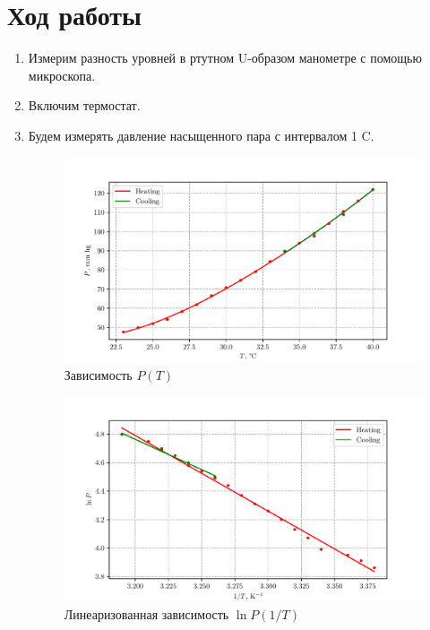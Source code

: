 \documentclass[12pt]{article}
\begin{document}
    \section{Ход работы}
    \begin{enumerate} 
        \item Измерим разность уровней в ртутном U-образом манометре с помощью
        микроскопа.
        \item Включим термостат.
        \item Будем измерять давление насыщенного пара с интервалом 1 \textdegree C.
        \begin{figure}[h!]
            \centering
            \includegraphics{data/curve.pdf}
            \caption{Зависимость $P(T)$}
        \end{figure}
        
        \begin{figure}[h!]
            \centering
            \includegraphics{data/lin.pdf}
            \caption{Линеаризованная зависимость $\ln P(1 / T)$}
        \end{figure}    
    \end{enumerate}
    
\end{document}
